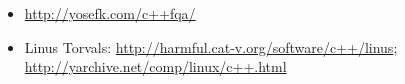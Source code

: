 \chapter{\CPP}







\section{}

\begin{itemize}

\item
\url{http://yosefk.com/c++fqa/}

\item
Linus Torvals: \url{http://harmful.cat-v.org/software/c++/linus}; \url{http://yarchive.net/comp/linux/c++.html}

\end{itemize}

